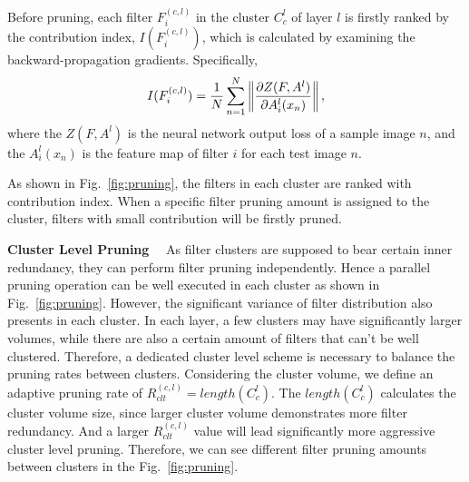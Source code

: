 \documentclass{article} %
\begin{document}
	Before pruning, each filter $F^{(c,l)}_i$ in the cluster $C_c^l$ of layer $l$ is firstly ranked by the contribution index, $I(F^{(c,l)}_i)$, which is calculated by examining the backward-propagation gradients.
	Specifically,
	\begin{equation}
		\medmuskip=-2mu
		I(F^{(c,l)}_i) = \frac{1}{N}\sum_{n=1}^{N} \left \| \frac{\partial Z(F, A^{l})}{\partial A_{i}^{l}(x_{n})} \right \|,
		\label{eq:contri}
		\vspace{-0.5mm}
	\end{equation}
	where the $Z(F, A^{l})$ is the neural network output loss of a sample image $n$, and the $A_i^l(x_{n})$ is the feature map of filter $i$ for each test image $n$.

	As shown in Fig.~\ref{fig:pruning}, the filters in each cluster are ranked with contribution index.
	When a specific filter pruning amount is assigned to the cluster, filters with small contribution will be firstly pruned.

\textbf{Cluster Level Pruning}
~~As filter clusters are supposed to bear certain inner redundancy, they can perform filter pruning independently.
	Hence a parallel pruning operation can be well executed in each cluster as shown in Fig.~\ref{fig:pruning}.
However, the significant variance of filter distribution also presents in each cluster.
	In each layer, a few clusters may have significantly larger volumes, while there are also a certain amount of filters that can't be well clustered.
	Therefore, a dedicated cluster level scheme is necessary to balance the pruning rates between clusters.
	Considering the cluster volume, we define an adaptive pruning rate of $R_{clt}^{(c,l)}= length(C_c^l)$.
	The $length(C_c^l)$ calculates the cluster volume size, since larger cluster volume demonstrates more filter redundancy.
	And a larger $R_{clt}^{(c,l)}$ value will lead significantly more aggressive cluster level pruning.
	Therefore, we can see different filter pruning amounts between clusters in the Fig.~\ref{fig:pruning}.
\end{document}
